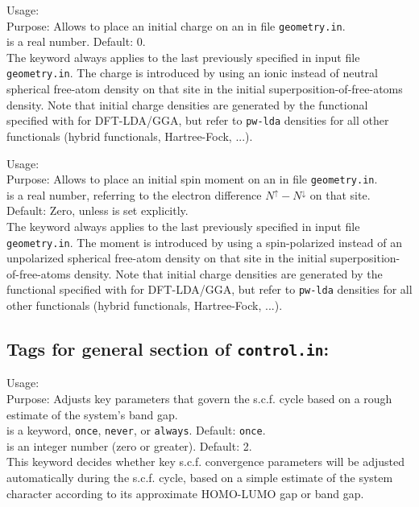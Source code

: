{
  \noindent
  Usage:   \\[1.0ex]
  Purpose: Allows to place an initial charge on an  in
    file \texttt{geometry.in}. \\[1.0ex]
   is a real number. Default: 0. \\
}
The  keyword always applies to the last
 previously specified in input file
\texttt{geometry.in}. The charge is introduced by using an ionic
instead of neutral spherical free-atom density on that site in the
initial superposition-of-free-atoms density. Note that initial charge
densities are generated by the functional specified with 
for DFT-LDA/GGA, but refer to \texttt{pw-lda} densities for all other
functionals (hybrid functionals, Hartree-Fock, ...).

{
  \noindent
  Usage:   \\[1.0ex]
  Purpose: Allows to place an initial spin moment on an  in
    file \texttt{geometry.in}. \\[1.0ex]
   is a real number, referring to the electron
  difference $N^\uparrow - N^\downarrow$ on that site. Default: Zero,
  unless  is set explicitly. \\
}
The  keyword always applies to the last
 previously specified in input file
\texttt{geometry.in}. The moment is introduced by using a
spin-polarized instead of an unpolarized spherical free-atom density
on that site in the initial superposition-of-free-atoms density. Note
that initial charge densities are generated by the functional
  specified with 
for DFT-LDA/GGA, but refer to \texttt{pw-lda} densities for all other
functionals (hybrid functionals, Hartree-Fock, ...).

\newpage

\subsection*{Tags for general section of \texttt{control.in}:}

{
  \noindent
  Usage:    \\[1.0ex]
  Purpose: Adjusts key parameters that govern the s.c.f. cycle based on
    a rough estimate of the system's band gap. \\[1.0ex]
   is a keyword, \texttt{once}, \texttt{never}, or \texttt{always}.
      Default: \texttt{once}. \\[1.0ex]
   is an integer number (zero or greater). Default: 2. \\
}
This keyword decides whether key s.c.f. convergence parameters will be adjusted
automatically during the s.c.f. cycle, based on a simple estimate of the system
character according to its approximate HOMO-LUMO gap or band gap.

